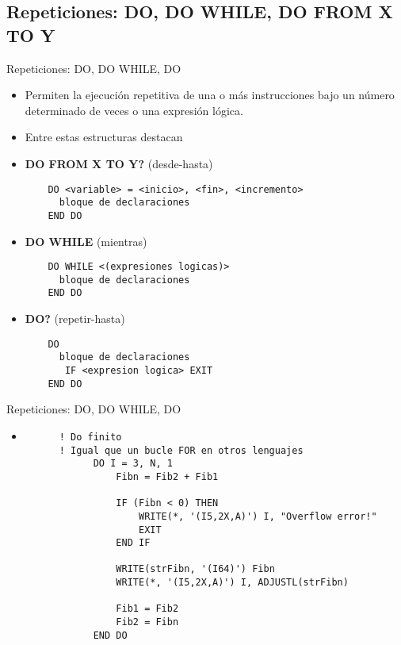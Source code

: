 
\subsection{Repeticiones: DO, DO WHILE, DO FROM X TO Y}

\begin{frame}[fragile]{Repeticiones: DO, DO WHILE, DO}  
 \begin{itemize}[<+(0)->]
  \item Permiten la ejecución repetitiva de una o más instrucciones bajo un número determinado de veces o una expresión lógica.
  \item Entre estas estructuras destacan
  \item [] \textbf{DO FROM X TO Y?} (desde-hasta) \\
   \begin{verbatim}
    DO <variable> = <inicio>, <fin>, <incremento>
      bloque de declaraciones
    END DO 
   \end{verbatim}
  \item [] \textbf{DO WHILE} (mientras) \\ 
   \begin{verbatim}
    DO WHILE <(expresiones logicas)> 
      bloque de declaraciones
    END DO 
   \end{verbatim}
  \item [] \textbf{DO?} (repetir-hasta)
   \begin{verbatim}
    DO 
      bloque de declaraciones
       IF <expresion logica> EXIT
    END DO 
   \end{verbatim}
 \end{itemize}
\end{frame}



\begin{frame}[fragile]{Repeticiones: DO, DO WHILE, DO} 
 \begin{itemize}[<+(0)->]
  \item []
  \begin{verbatim}
      ! Do finito
      ! Igual que un bucle FOR en otros lenguajes
            DO I = 3, N, 1
                Fibn = Fib2 + Fib1

                IF (Fibn < 0) THEN
                    WRITE(*, '(I5,2X,A)') I, "Overflow error!"
                    EXIT
                END IF

                WRITE(strFibn, '(I64)') Fibn
                WRITE(*, '(I5,2X,A)') I, ADJUSTL(strFibn)

                Fib1 = Fib2
                Fib2 = Fibn
            END DO
  \end{verbatim}
 \end{itemize}
\end{frame}



